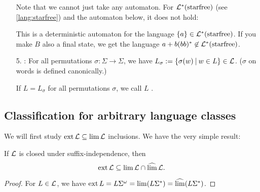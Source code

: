 \begin{enumerate}
Note that we cannot just take any automaton. For $\mathcal{L}^*(\textup{\textrm{starfree}})$ (see \cref{lang:starfree}) and the automaton below, it does not hold:

  
This is a deterministic automaton for the language $\Set{a} \in \Lang^*(\mathtext{starfree})$. If you make $B$ also a final state, we get the language $a + b(bb)^* \not\in \mathcal{L}^*(\textup{\textrm{starfree}})$.

\item[5.] : For all permutations $\sigma : \Sigma \rightarrow \Sigma$, we have $L_\sigma := \Set{\sigma(w)}{w \in L} \in \Lang$. ($\sigma$ on words is defined canonically.)

If $L = L_\sigma$ for all permutations $\sigma$, we call $L$ .

\end{enumerate}

\subsection{Classification for arbitrary language classes}

We will first study $\operatorname{ext} \mathcal{L} \subseteq \lim \mathcal{L}$ inclusions. We have the very simple result:
\begin{lemma}
\label{gen:non-suffix-sens}
If $\mathcal{L}$ is closed under suffix-independence, then
\[ \operatorname{ext} \mathcal{L} \subseteq \lim \mathcal{L} \cap \operatorname{\widehat{lim}} \mathcal{L} . \]
\begin{proof}
For $L \in \mathcal{L}$, we have $\operatorname{ext} L = L \Sigma^\omega = \lim (L \Sigma^*) = \operatorname{\widehat{lim}} (L \Sigma^*)$.
\end{proof}
\end{lemma}

